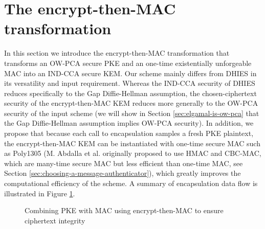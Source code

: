 \documentclass[journal=tches,submission]{iacrtrans}
\newcommand{\mac}{\texttt{MAC}}
\newcommand{\pk}{\texttt{pk}}
\newcommand{\leftsample}{\stackrel{\$}{\leftarrow}}
\begin{document}
\section{The encrypt-then-MAC transformation}\label{sec:main-results}
In this section we introduce the encrypt-then-MAC transformation that transforms an OW-PCA secure PKE and an one-time existentially unforgeable MAC into an IND-CCA secure KEM. Our scheme mainly differs from DHIES in its versatility and input requirement. Whereas the IND-CCA security of DHIES reduces specifically to the Gap Diffie-Hellman assumption, the chosen-ciphertext security of the encrypt-then-MAC KEM reduces more generally to the OW-PCA security \cite{DBLP:conf/ctrsa/OkamotoP01} of the input scheme (we will show in Section \ref{sec:elgamal-is-ow-pca} that the Gap Diffie-Hellman assumption implies OW-PCA security). In addition, we propose that because each call to encapsulation samples a fresh PKE plaintext, the encrypt-then-MAC KEM can be instantiated with one-time secure MAC such as Poly1305 (M. Abdalla et al. originally proposed to use HMAC and CBC-MAC, which are many-time secure MAC but less efficient than one-time MAC, see Section \ref{sec:choosing-a-message-authenticator}), which greatly improves the computational efficiency of the scheme. A summary of encapsulation data flow is illustrated in Figure \ref{fig:etm-diagram}.

\begin{figure}[h]
    \centering

    \caption{Combining PKE with MAC using encrypt-then-MAC to ensure ciphertext integrity}\label{fig:etm-diagram}
\end{figure}
\end{document}
